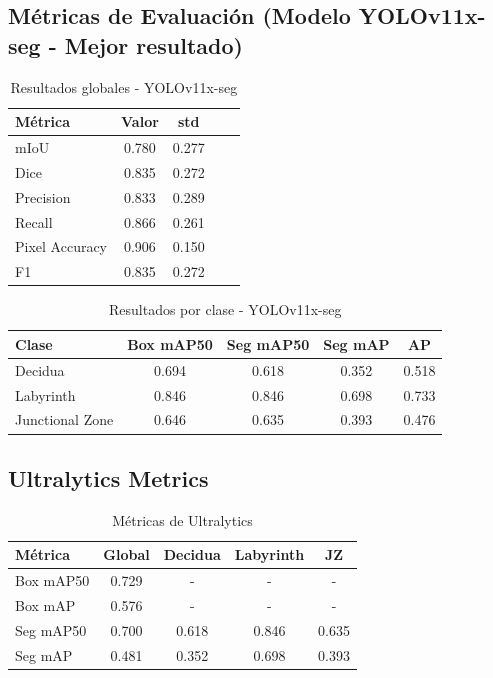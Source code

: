 \documentclass[12pt,a4paper]{article}
\begin{document}
\subsection{Métricas de Evaluación (Modelo YOLOv11x-seg - Mejor resultado)}

\begin{table}[ht]
\centering
\caption{Resultados globales - YOLOv11x-seg}
\label{tab:results-global}
\begin{tabular}{@{}lcccc@{}}
\toprule
Métrica & Valor & std \\ \midrule
mIoU & 0.780 & 0.277 \\
Dice & 0.835 & 0.272 \\
Precision & 0.833 & 0.289 \\
Recall & 0.866 & 0.261 \\
Pixel Accuracy & 0.906 & 0.150 \\
F1 & 0.835 & 0.272 \\ \bottomrule
\end{tabular}
\end{table}

\begin{table}[ht]
\centering
\caption{Resultados por clase - YOLOv11x-seg}
\label{tab:results-per-class}
\begin{tabular}{@{}lcccc@{}}
\toprule
Clase & Box mAP50 & Seg mAP50 & Seg mAP & AP \\ \midrule
Decidua & 0.694 & 0.618 & 0.352 & 0.518 \\
Labyrinth & 0.846 & 0.846 & 0.698 & 0.733 \\
Junctional Zone & 0.646 & 0.635 & 0.393 & 0.476 \\ \bottomrule
\end{tabular}
\end{table}

\subsection{Ultralytics Metrics}

\begin{table}[ht]
\centering
\caption{Métricas de Ultralytics}
\label{tab:ultralytics-metrics}
\begin{tabular}{@{}lcccc@{}}
\toprule
Métrica & Global & Decidua & Labyrinth & JZ \\ \midrule
Box mAP50 & 0.729 & - & - & - \\
Box mAP & 0.576 & - & - & - \\
Seg mAP50 & 0.700 & 0.618 & 0.846 & 0.635 \\
Seg mAP & 0.481 & 0.352 & 0.698 & 0.393 \\ \bottomrule
\end{tabular}
\end{table}
\end{document}
